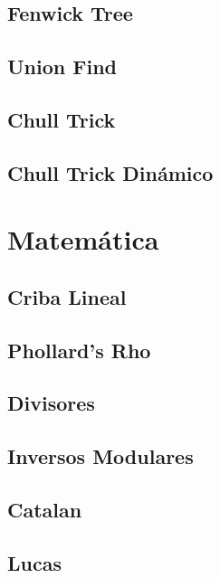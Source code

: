 \documentclass[a4paper,11pt,landscape,twocolumn]{article}
\begin{document}
\subsection{Fenwick Tree}

\subsection{Union Find}

\subsection{Chull Trick}

\subsection{Chull Trick Dinámico}


\section{Matemática} %
\subsection{Criba Lineal}

\subsection{Phollard's Rho}

\subsection{Divisores}

\subsection{Inversos Modulares}


\subsection{Catalan}

\subsection{Lucas}

\end{document}
